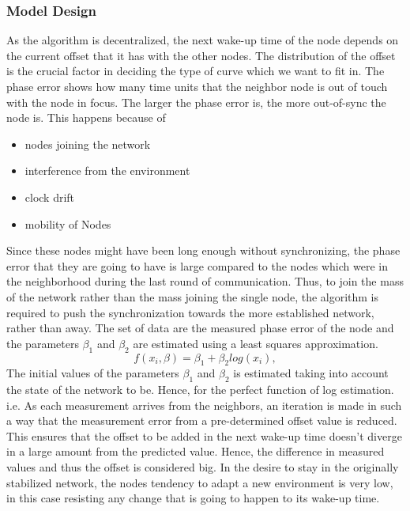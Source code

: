 \documentclass[a4paper,10pt]{report}
\begin{document}
\subsubsection{Model Design}
As the algorithm is decentralized, the next wake-up time of the node depends on the current offset that it has with the other nodes. The distribution of the offset is the crucial factor in deciding the type of curve which we want to fit in. The phase error shows how many time units that the neighbor node is out of touch with the node in focus. The larger the phase error is, the more out-of-sync the node is. This happens because of
\begin{itemize}
\item nodes joining the network
\item interference from the environment
\item clock drift
\item mobility of Nodes
\end{itemize}
Since these nodes might have been long enough without synchronizing, the phase error that they are going to have is large compared to the
nodes which were in the neighborhood during the last round of communication. Thus, to join the mass of the network rather than the
mass joining the single node, the algorithm is required to push the synchronization towards the more established network, rather than
away.\newline
The set of data are the measured phase error of the node and the parameters $\beta_1$ and $\beta_2$ are estimated using a least
squares approximation.
\begin{equation}
 f(x_i,\beta)= \beta _1 + \beta_2log(x_i),
\end{equation}
The initial values of the parameters $\beta_1$ and $\beta_2$ is estimated taking into account the state of the network to be. Hence, for the perfect function of log estimation.
i.e. \newline \newline
As each measurement arrives from the neighbors, an iteration is made in such a way that the measurement error from a pre-determined offset value is reduced. This ensures that the offset to be added in the next wake-up time doesn't diverge in a large amount from the predicted value. Hence, the difference in measured values and thus the offset is considered big. In the desire to stay in the originally stabilized
network, the nodes tendency to adapt a new environment is very low, in this case resisting any change that is going to happen to its
wake-up time. \newline
\end{document}
